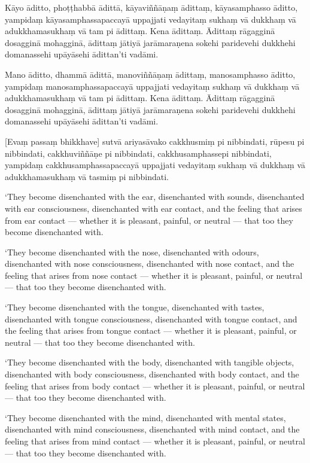 Kāyo āditto, phoṭṭhabbā ādittā, kāyaviññāṇaṃ ādittaṃ, kāyasamphasso
āditto, yampidaṃ kāyasamphassapaccayā uppajjati vedayitaṃ sukhaṃ vā
dukkhaṃ vā adukkhamasukhaṃ vā tam pi ādittaṃ. Kena ādittaṃ. Ādittaṃ
rāgagginā dosagginā mohagginā, ādittaṃ jātiyā jarāmaraṇena sokehi
paridevehi dukkhehi domanassehi upāyāsehi ādittan'ti vadāmi.

Mano āditto, dhammā ādittā, manoviññāṇaṃ ādittaṃ, manosamphasso āditto,
yampidaṃ manosamphassapaccayā uppajjati vedayitaṃ sukhaṃ vā dukkhaṃ vā
adukkhamasukhaṃ vā tam pi ādittaṃ. Kena ādittaṃ. Ādittaṃ rāgagginā
dosagginā mohagginā, ādittaṃ jātiyā jarāmaraṇena sokehi paridevehi
dukkhehi domanassehi upāyāsehi ādittan'ti vadāmi.

\enlargethispage{2\baselineskip}

[Evaṃ passaṃ bhikkhave] sutvā ariyasāvako cakkhusmiṃ pi nibbindati,
rūpesu pi nibbindati, cakkhuviññāṇe pi nibbindati, cakkhusamphassepi
nibbindati, yampidaṃ cakkhusamphassapaccayā uppajjati vedayitaṃ sukhaṃ
vā dukkhaṃ vā adukkhamasukhaṃ vā tasmiṃ pi nibbindati.

\clearpage

\englishText
\markboth{\englishTitle}{\rightmark}

‘They become disenchanted with the ear, disenchanted with sounds,
disenchanted with ear consciousness, disenchanted with ear contact, and
the feeling that arises from ear contact --- whether it is pleasant,
painful, or neutral --- that too they become disenchanted with.

‘They become disenchanted with the nose, disenchanted with odours,
disenchanted with nose consciousness, disenchanted with nose contact,
and the feeling that arises from nose contact --- whether it is pleasant,
painful, or neutral --- that too they become disenchanted with.

‘They become disenchanted with the tongue, disenchanted with tastes,
disenchanted with tongue consciousness, disenchanted with tongue
contact, and the feeling that arises from tongue contact --- whether it is
pleasant, painful, or neutral --- that too they become disenchanted with.

‘They become disenchanted with the body, disenchanted with tangible
objects, disenchanted with body consciousness, disenchanted with body
contact, and the feeling that arises from body contact --- whether it is
pleasant, painful, or neutral --- that too they become disenchanted with.

‘They become disenchanted with the mind, disenchanted with mental
states, disenchanted with mind consciousness, disenchanted with mind
contact, and the feeling that arises from mind contact --- whether it is
pleasant, painful, or neutral --- that too they become disenchanted with.

